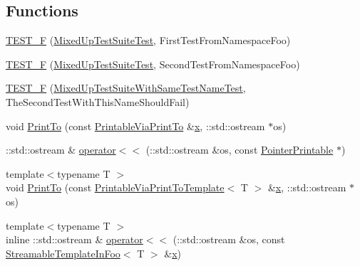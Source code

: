 \subsection*{Functions}
\begin{DoxyCompactItemize}
\item 
\mbox{\hyperlink{namespacefoo_a849b0cc834d25429f0391db7e0eb9dc1}{T\+E\+S\+T\+\_\+F}} (\mbox{\hyperlink{classfoo_1_1_mixed_up_test_suite_test}{Mixed\+Up\+Test\+Suite\+Test}}, First\+Test\+From\+Namespace\+Foo)
\item 
\mbox{\hyperlink{namespacefoo_a5e6f45cc38f6752f717235b183163550}{T\+E\+S\+T\+\_\+F}} (\mbox{\hyperlink{classfoo_1_1_mixed_up_test_suite_test}{Mixed\+Up\+Test\+Suite\+Test}}, Second\+Test\+From\+Namespace\+Foo)
\item 
\mbox{\hyperlink{namespacefoo_afced5d7fbc3e96e3309591e09fbae5c4}{T\+E\+S\+T\+\_\+F}} (\mbox{\hyperlink{classfoo_1_1_mixed_up_test_suite_with_same_test_name_test}{Mixed\+Up\+Test\+Suite\+With\+Same\+Test\+Name\+Test}}, The\+Second\+Test\+With\+This\+Name\+Should\+Fail)
\item 
void \mbox{\hyperlink{namespacefoo_ac435de653934c97045bbdba8c8afbe3f}{Print\+To}} (const \mbox{\hyperlink{structfoo_1_1_printable_via_print_to}{Printable\+Via\+Print\+To}} \&\mbox{\hyperlink{_obj__test_2lib_2googletest-master_2googlemock_2test_2gmock-matchers__test_8cc_a6150e0515f7202e2fb518f7206ed97dc}{x}}, \+::std\+::ostream $\ast$os)
\item 
\+::std\+::ostream \& \mbox{\hyperlink{namespacefoo_a3b27f2298929aebc63bfe4b147b1e152}{operator$<$$<$}} (\+::std\+::ostream \&os, const \mbox{\hyperlink{structfoo_1_1_pointer_printable}{Pointer\+Printable}} $\ast$)
\item 
{\footnotesize template$<$typename T $>$ }\\void \mbox{\hyperlink{namespacefoo_a7b78eba501ea7ff1226a8cb40b6e3d92}{Print\+To}} (const \mbox{\hyperlink{classfoo_1_1_printable_via_print_to_template}{Printable\+Via\+Print\+To\+Template}}$<$ T $>$ \&\mbox{\hyperlink{_obj__test_2lib_2googletest-master_2googlemock_2test_2gmock-matchers__test_8cc_a6150e0515f7202e2fb518f7206ed97dc}{x}}, \+::std\+::ostream $\ast$os)
\item 
{\footnotesize template$<$typename T $>$ }\\inline \+::std\+::ostream \& \mbox{\hyperlink{namespacefoo_abe04f604d114085b0b9af25600ef00da}{operator$<$$<$}} (\+::std\+::ostream \&os, const \mbox{\hyperlink{classfoo_1_1_streamable_template_in_foo}{Streamable\+Template\+In\+Foo}}$<$ T $>$ \&\mbox{\hyperlink{_obj__test_2lib_2googletest-master_2googlemock_2test_2gmock-matchers__test_8cc_a6150e0515f7202e2fb518f7206ed97dc}{x}})

\end{DoxyCompactItemize}
